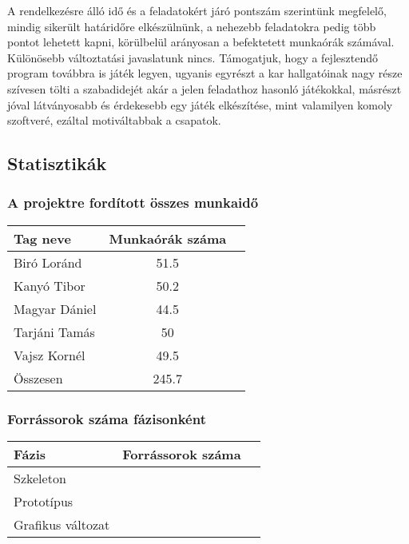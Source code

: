 A rendelkezésre álló idő és a feladatokért járó pontszám szerintünk megfelelő, mindig sikerült határidőre elkészülnünk, a nehezebb feladatokra pedig több pontot lehetett kapni, körülbelül arányosan a befektetett munkaórák számával. Különösebb változtatási javaslatunk nincs. Támogatjuk, hogy a fejlesztendő program továbbra is játék legyen, ugyanis egyrészt a kar hallgatóinak nagy része szívesen tölti a szabadidejét akár a jelen feladathoz hasonló játékokkal, másrészt jóval látványosabb és érdekesebb egy játék elkészítése, mint valamilyen komoly szoftveré, ezáltal motiváltabbak a csapatok.


\subsection{Statisztikák}

\subsubsection{A projektre fordított összes munkaidő}

\begin{tabular}{|p{130pt}|c|p{150pt}|}
\hline 
\textbf{Tag neve} & \textbf{Munkaórák száma}\\ 
\hline 
Biró Loránd & 51.5\\ 
\hline 
Kanyó Tibor & 50.2\\
\hline 
Magyar Dániel & 44.5\\
\hline 
Tarjáni Tamás & 50\\
\hline 
Vajsz Kornél & 49.5\\
\hline 
Összesen & 245.7\\
\hline
\end{tabular}

\subsubsection{Forrássorok száma fázisonként}

\begin{tabular}{|p{130pt}|c|p{150pt}|}
\hline 
\textbf{Fázis} & \textbf{Forrássorok száma}\\ 
\hline 
Szkeleton & \\ 
\hline 
Prototípus & \\
\hline 
Grafikus változat & \\
\hline
\end{tabular}

